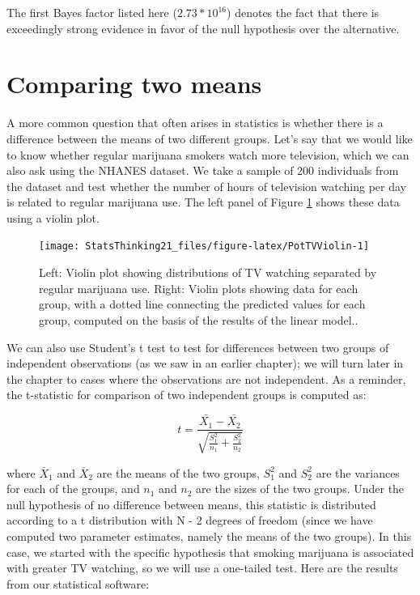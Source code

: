 \documentclass[12pt,]{book}
\theoremstyle{definition}
\theoremstyle{definition}
\theoremstyle{definition}
\theoremstyle{remark}
\begin{document}
The first Bayes factor listed here (\(2.73 * 10^{16}\)) denotes the fact that there is exceedingly strong evidence in favor of the null hypothesis over the alternative.

\hypertarget{comparing-two-means}{%
\section{Comparing two means}\label{comparing-two-means}}

A more common question that often arises in statistics is whether there is a difference between the means of two different groups. Let's say that we would like to know whether regular marijuana smokers watch more television, which we can also ask using the NHANES dataset. We take a sample of 200 individuals from the dataset and test whether the number of hours of television watching per day is related to regular marijuana use. The left panel of Figure \ref{fig:PotTVViolin} shows these data using a violin plot.

\begin{figure}
\texttt{[image: StatsThinking21\_files/figure-latex/PotTVViolin-1]} \caption{Left: Violin plot showing distributions of TV watching separated by regular marijuana use. Right: Violin plots showing data for each group, with a dotted line connecting the predicted values for each group, computed on the basis of the results of the linear model.. }\label{fig:PotTVViolin}
\end{figure}

We can also use Student's t test to test for differences between two groups of independent observations (as we saw in an earlier chapter); we will turn later in the chapter to cases where the observations are not independent. As a reminder, the t-statistic for comparison of two independent groups is computed as:

\[
t = \frac{\bar{X_1} - \bar{X_2}}{\sqrt{\frac{S_1^2}{n_1} + \frac{S_2^2}{n_2}}}
\]

where \(\bar{X}_1\) and \(\bar{X}_2\) are the means of the two groups, \(S^2_1\) and \(S^2_2\) are the variances for each of the groups, and \(n_1\) and \(n_2\) are the sizes of the two groups. Under the null hypothesis of no difference between means, this statistic is distributed according to a t distribution with N - 2 degrees of freedom (since we have computed two parameter estimates, namely the means of the two groups). In this case, we started with the specific hypothesis that smoking marijuana is associated with greater TV watching, so we will use a one-tailed test. Here are the results from our statistical software:
\end{document}
